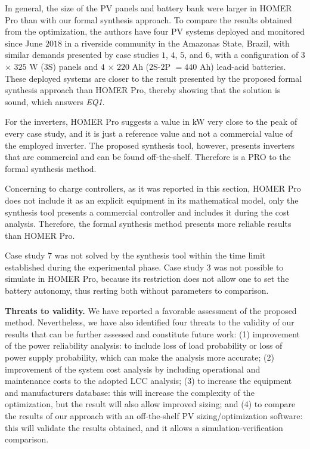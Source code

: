 \documentclass[runningheads]{llncs}
\begin{document}
In general, the size of the PV panels and battery bank were larger in HOMER Pro than with our formal synthesis approach. To compare the results obtained from the optimization, the authors have four PV systems deployed and monitored since June $2018$ in a riverside community in the Amazonas State, Brazil, with similar demands presented by case studies $1$, $4$, $5$, and $6$, with a configuration of $3$ $\times$ $325$ W ($3$S) panels and $4$ $\times$ $220$ Ah ($2$S-$2$P $= 440$ Ah) lead-acid batteries. These deployed systems are closer to the result presented by the proposed formal synthesis approach than HOMER Pro, thereby showing that the solution is sound, which answers \textit{EQ1}.

For the inverters, HOMER Pro suggests a value in kW very close to the peak of every case study, and it is just a reference value and not a commercial value of the employed inverter. The proposed synthesis tool, however, presents inverters that are commercial and can be found off-the-shelf. Therefore is a PRO to the formal synthesis method.

Concerning to charge controllers, as it was reported in this section, HOMER Pro does not include it as an explicit equipment in its mathematical model, only the synthesis tool presents a commercial controller and includes it during the cost analysis. Therefore, the formal synthesis method presents more reliable results than HOMER Pro.

Case study $7$ was not solved by the synthesis tool within the time limit established during the experimental phase. Case study $3$ was not possible to simulate in HOMER Pro, because its restriction does not allow one to set the battery autonomy, thus resting both without parameters to comparison.

\noindent \textbf{Threats to validity.} We have reported a favorable assessment of the proposed method. Nevertheless, we have also identified four threats to the validity of our results that can be further assessed and constitute future work: (1) improvement of the power reliability analysis: to include loss of load probability or loss of power supply probability, which can make the analysis more accurate; (2) improvement of the system cost analysis by including operational and maintenance costs to the adopted LCC analysis; (3) to increase the equipment and manufacturers database: this will increase the complexity of the optimization, but the result will also allow improved sizing; and (4) to compare the results of our approach with an off-the-shelf PV sizing/optimization software: this will validate the results obtained, and it allows a simulation-verification comparison.
\end{document}

